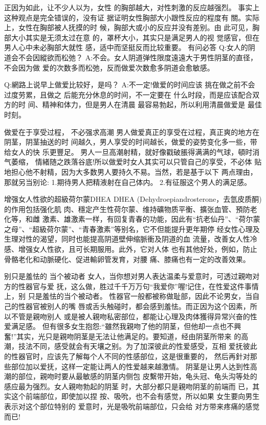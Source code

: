 \documentclass[12pt,UTF8]{ctexbook}
\begin{document}
正因为如此，让不少人以为，女性
的胸部越大，对性刺激的反应越强烈。
事实上这种观点是完全错误的，没有证
据证明女性胸部大小跟性反应的程度有
關。实际上，女性在胸部被人抚摸的时
候，胸部大或小的反应并没有差别。由
此可见，胸部大小其实是无须太过在意
的，罩杯大小，其实只是满足男人的视
觉感官，但在男人心中未必胸部大就性
感，适中而坚挺反而比较重要。
有问必答
Q:女人的阴道会不会因縱欲而松弛？
A:不会。女人阴道弹性限度遠遠大于男性阴茎的直径，不会因为做
爱的次数多而松弛，反而做爱次数愈多阴道会愈敏感。

Q:網路上说早上做爱比较好，是吗？
A:不一定!做爱的时间应该
挑在做之前不会过度劳累，且做之
后能充分休息的时间，不一定要在
什么时段，而是应该配合双方的时
间、精神和体力，但是男人在清晨
最容易勃起，所以利用清晨做爱是
最佳时刻。

做爱在于享受过程，
不必强求高潮
男人做爱真正的享受在过程，真正爽的地方在阴茎，阴茎抽送的时
间越久，男人享受的时间越长，做爱的姿势变化多一些，带给女人的快
乐更豐足。
男人一旦高潮射精，就好像戳破脹得满满的气球，頓时消气萎缩，
情緒随之跌落谷底!所以做爱时女人其实可以只管自己的享受，不必体
贴地担心他不射精，因为大多数男人要持久不易。当然，若是基于以下
两点理由，那就另当别论:
1.期待男人把精液射在自己体内。
2.有征服这个男人的满足感。

增强女人性欲的超級荷尔蒙DHEA
DHEA (Dehydroepiandrosterone，去氫皮质酮)的作用包括强化肌
肉、穩定产生性荷尔蒙、维持礦物质平衡、擴张血管、預防老化等，和雌
激素、雄激素一样，有回复青春的功能，因此有“抗老仙丹”、“荷尔蒙
之母”、“超級荷尔蒙”、“青春激素”等别名，它不但能提升更年期停
经女性心理及生理对性的渴望，同时也能提高阴道壁伸缩脈衝及阴道的血
流量，改善女人性冷感、增强女人性欲，且可长期服用。此外，它对人体
也有其他好处，例如，防止骨骼老化和动脈硬化、促进輸卵管发育，对腰
痛、膝痛也有一定的改善效果。

别只是羞怯的
当个被动者
女人，当你想对男人表达温柔与爱意时，可透过親吻对方的性器官与爱
抚，这么做，胜过千千万万句“我爱你”喔!记住，在性爱这件事情上，别
只是羞怯的当个被动者。
性器官一般都被称做耻部，因此不论男女，当自己的性器官被别人的嘴
唇或舌头触碰时，都会感到羞怯。而正因为这个因素，所以不管是親吻别人
或是被人親吻私密部位，都能让心理及肉体獲得异常兴奋的性爱满足感。
但有很多女生抱怨:“雖然我親吻了他的阴茎，但他却一点也不興
奮!”其实，光只是親吻阴茎是无法让他满足的。要知道，经由阴茎所带来
的高潮，技法不同，感受就会有天壤之别。为了加深彼此的性爱感受，互相
爱抚彼此的性器官时，应该先了解每个人不同的性感部位，这是很重要的，
然后再針对那些部位加以爱抚，这样一定能让两人的性爱越来越激情。
阴茎是让男人达到性高潮的部位，親吻时要从最敏感的阴茎内侧包
皮繫带开始，龟头冠、龟头沟等处的
感应最为强烈。女人親吻勃起的阴茎
时，大部分都只是親吻阴茎的前端而
已，其实这个前端部位，即使加以捏
按、吸吮，也不会有感觉，所以如果
女生要向男生表示对这个部位特别的
爱意时，光是吸吮前端部位，只会给
对方带来疼痛的感觉而已!
\end{document}
